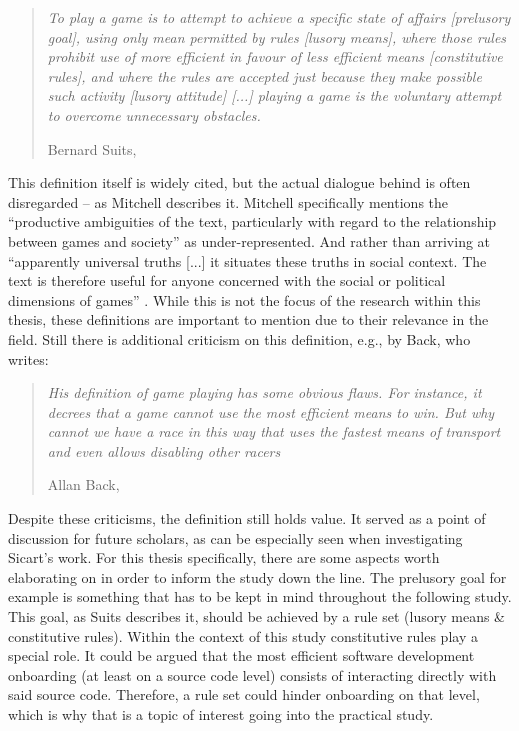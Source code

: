 \begin{quote}
  \textit{To play a game is to attempt to achieve a specific state of affairs [prelusory goal], using only mean permitted by rules [lusory means], where those rules prohibit use of more efficient in favour of less efficient means [constitutive rules], and where the rules are accepted just because they make possible such activity [lusory attitude] [...] playing a game is the voluntary attempt to overcome unnecessary obstacles.}

  \footnotesize{Bernard Suits, \cite[p.35]{suits2020grasshopper}}
\end{quote}

This definition itself is widely cited, but the actual dialogue behind is often disregarded -- as Mitchell describes it. Mitchell specifically mentions the \enquote{productive ambiguities of the text, particularly with regard to the relationship between games and society} \cite{mitchell2020reconsidering} as under-represented. And rather than arriving at \enquote{apparently universal truths [...] it situates these truths in social context. The text is therefore useful for anyone concerned with the social or political dimensions of games} \cite{mitchell2020reconsidering}. While this is not the focus of the research within this thesis, these definitions are important to mention due to their relevance in the field. Still there is additional criticism on this definition, e.g., by Back, who writes:

\begin{quote}
  \textit{His definition of game playing has some obvious flaws. For instance, it decrees that a game cannot use the most efficient means to win. But why cannot we have a race in this way that uses the fastest means of transport and even allows disabling other racers}

  \footnotesize{Allan Back, \cite[p. 5]{back2008paper}}
\end{quote}

Despite these criticisms, the definition still holds value. It served as a point of discussion for future scholars, as can be especially seen when investigating Sicart's work. For this thesis specifically, there are some aspects worth elaborating on in order to inform the study down the line. The prelusory goal for example is something that has to be kept in mind throughout the following study. This goal, as Suits describes it, should be achieved by a rule set (lusory means \& constitutive rules). Within the context of this study constitutive rules play a special role. It could be argued that the most efficient software development onboarding (at least on a source code level) consists of interacting directly with said source code. Therefore, a rule set could hinder onboarding on that level, which is why that is a topic of interest going into the practical study.

